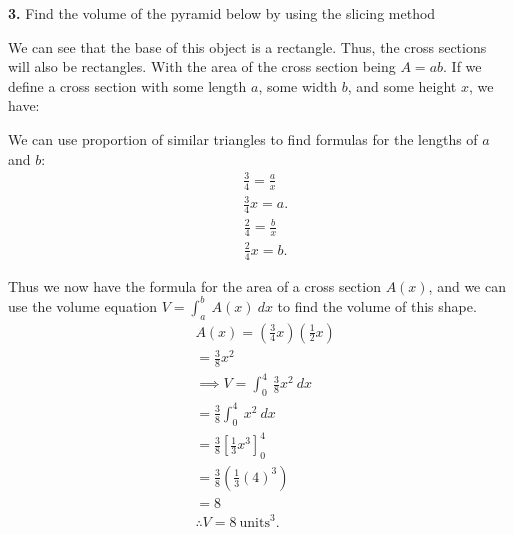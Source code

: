 \documentclass{report}
\begin{document}
    \pagebreak \bigbreak \noindent 
    \begin{mdframed}
        \textbf{3.} Find the volume of the pyramid below by using the slicing method
    \end{mdframed}
    \bigbreak \noindent 
    \begin{minipage}[]{0.47\textwidth}
    \end{minipage}
    \begin{minipage}[]{0.47\textwidth}
        We can see that the base of this object is a rectangle. Thus, the cross sections will also be rectangles. With the area of the cross section being $A = ab$. If we define a cross section with some length $a$, some width $b$, and some height $x$, we have:
    \end{minipage}
    \bigbreak \noindent 
    \begin{minipage}[]{0.47\textwidth}
    \end{minipage}
    \begin{minipage}[]{0.47\textwidth}
        We can use proportion of similar triangles to find formulas for the lengths of $a$ and $b$:
        \begin{align*}
            &\frac{3}{4} = \frac{a}{x} \\
            &\frac{3}{4}x = a
        .\end{align*}
        \begin{align*}
            &\frac{2}{4} = \frac{b}{x} \\
            & \frac{2}{4}x = b
        .\end{align*}
    \end{minipage}
    \bigbreak \noindent 
    Thus we now have the formula for the area of a cross section $A(x)$, and we can use the volume equation $V = \int_{a}^{b}\ A(x)\ dx $ to find the volume of this shape.
    \begin{align*}
        &A(x) = \left(\frac{3}{4}x\right)\left(\frac{1}{2}x\right) \\
        &=\frac{3}{8}x^{2} \\
        &\implies V = \int_{0}^{4}\ \frac{3}{8}x^{2}\ dx \\
        &= \frac{3}{8}\int_{0}^{4}\ x^{2}\ dx \\
        &=\frac{3}{8}\left[\frac{1}{3}x^{3}\right]^{4}_0 \\
        &=\frac{3}{8}\left(\frac{1}{3}(4)^{3}\right) \\
        &=8 \\
        &\therefore V = 8\ \text{units}^{3}
    .\end{align*}
\end{document}
